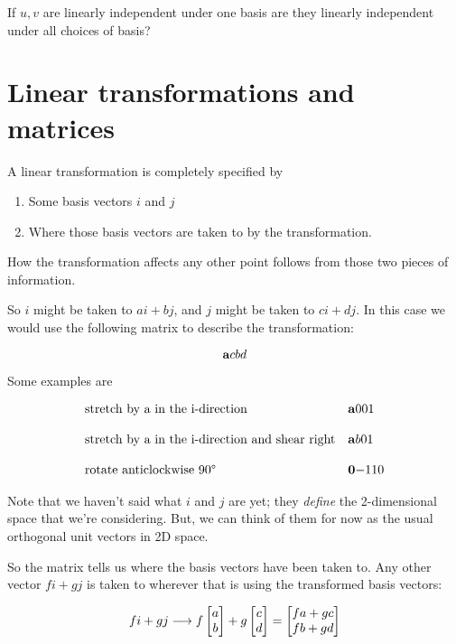 \begin{problem*}
  If $u, v$ are linearly independent under one basis are they linearly independent under all choices of basis?
\end{problem*}

\section{Linear transformations and matrices}

A linear transformation is completely specified by

\begin{enumerate}
\item Some basis vectors $i$ and $j$
\item Where those basis vectors are taken to by the transformation.
\end{enumerate}

How the transformation affects any other point follows from those two pieces of
information.

So $i$ might be taken to $ai + bj$, and $j$ might be taken to $ci + dj$.
In this case we would use the following matrix to describe the
transformation:

$$
\mathbf{a}{c}
    {b}{d}
$$

Some examples are

$$
\begin{array}{ll}
\text{stretch by a in the i-direction} & \mathbf{a}{0}
                                             {0}{1}
\\\\
\text{stretch by a in the i-direction and shear right} & \mathbf{a}{b}
                                                             {0}{1}
\\\\
\text{rotate anticlockwise 90°} & \mathbf{0}{-1}
                                      {1}{ 0}
\end{array}
$$

Note that we haven't said what $i$ and $j$ are yet; they \textit{define} the
2-dimensional space that we're considering. But, we can think of them for now
as the usual orthogonal unit vectors in 2D space.

So the matrix tells us where the basis vectors have been taken to. Any other
vector $fi + gj$ is taken to wherever that is using the transformed basis
vectors:

$$
fi + gj \longrightarrow f\begin{bmatrix}a\\b\end{bmatrix} + g\begin{bmatrix}c\\d\end{bmatrix} = \begin{bmatrix}fa + gc\\fb + gd\end{bmatrix}
$$


